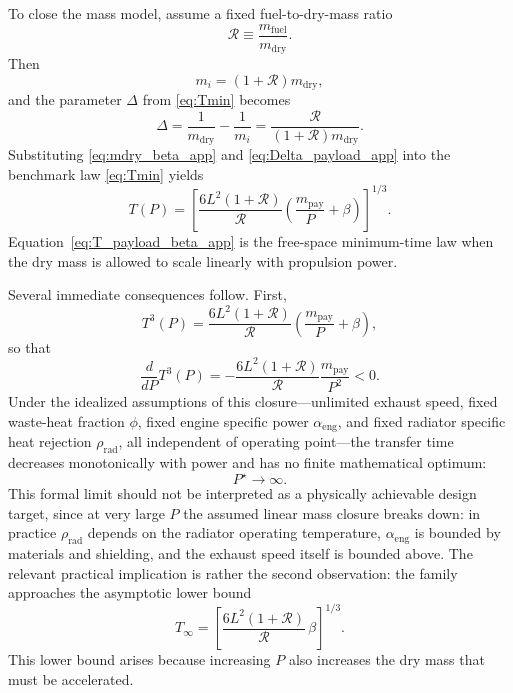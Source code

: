 \documentclass[journal,a4paper]{IEEEtran}
\begin{document}
To close the mass model, assume a fixed fuel-to-dry-mass ratio
\begin{equation}
  \mathcal{R}\equiv \frac{m_\mathrm{fuel}}{m_\mathrm{dry}}.
\end{equation}
Then
\begin{equation}
  m_i=(1+\mathcal{R})m_\mathrm{dry},
\end{equation}
and the parameter \(\Delta\) from \eqref{eq:Tmin} becomes
\begin{equation}
  \Delta
  = \frac{1}{m_\mathrm{dry}}-\frac{1}{m_i}
  = \frac{\mathcal{R}}{(1+\mathcal{R})m_\mathrm{dry}}.
  \label{eq:Delta_payload_app}
\end{equation}
Substituting \eqref{eq:mdry_beta_app} and \eqref{eq:Delta_payload_app} into the benchmark law \eqref{eq:Tmin} yields
\begin{equation}
  T(P)
  =
  \left[
    \frac{6L^2(1+\mathcal{R})}{\mathcal{R}}
    \left(
      \frac{m_\mathrm{pay}}{P}+\beta
    \right)
  \right]^{1/3}.
  \label{eq:T_payload_beta_app}
\end{equation}
Equation~\eqref{eq:T_payload_beta_app} is the free-space minimum-time law when the dry mass is allowed to scale linearly with propulsion power.

Several immediate consequences follow.
First,
\begin{equation}
  T^3(P)
  =
  \frac{6L^2(1+\mathcal{R})}{\mathcal{R}}
  \left(
    \frac{m_\mathrm{pay}}{P}+\beta
  \right),
\end{equation}
so that
\begin{equation}
  \frac{d}{dP}T^3(P)
  =
  -\frac{6L^2(1+\mathcal{R})}{\mathcal{R}}
   \frac{m_\mathrm{pay}}{P^2}
  <0.
\end{equation}
Under the idealized assumptions of this closure---unlimited exhaust speed, fixed waste-heat fraction \(\phi\), fixed engine specific power \(\alpha_\mathrm{eng}\), and fixed radiator specific heat rejection \(\rho_\mathrm{rad}\), all independent of operating point---the transfer time decreases monotonically with power and has no finite mathematical optimum:
\begin{equation}
  P^\star \to \infty.
\end{equation}
This formal limit should not be interpreted as a physically achievable design target, since at very large \(P\) the assumed linear mass closure breaks down: in practice \(\rho_\mathrm{rad}\) depends on the radiator operating temperature, \(\alpha_\mathrm{eng}\) is bounded by materials and shielding, and the exhaust speed itself is bounded above. The relevant practical implication is rather the second observation: the family approaches the asymptotic lower bound
\begin{equation}
  T_\infty
  =
  \left[
    \frac{6L^2(1+\mathcal{R})}{\mathcal{R}}\,\beta
  \right]^{1/3}.
  \label{eq:T_infty_beta_app}
\end{equation}
This lower bound arises because increasing \(P\) also increases the dry mass that must be accelerated.
\end{document}
